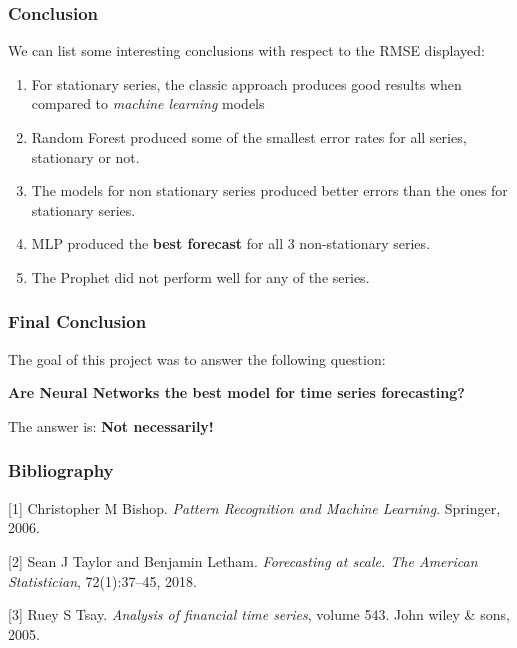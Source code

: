\documentclass{beamer}
\begin{document}
\begin{frame}
\begin{table}
{		}
	\end{table}
	
\end{frame}
	
	\begin{frame}
		\frametitle{Conclusion}
		We can list some interesting conclusions with respect to the RMSE displayed:\pause
		\begin{enumerate}
			\item For stationary series, the classic approach produces good results when compared to \textit{machine learning} models\pause
			\item Random Forest produced some of the smallest error rates for all series, stationary or not.\pause
			\item The models for non stationary series produced better errors than the ones for stationary series.\pause
			\item MLP produced the \textbf{best forecast} for all 3 non-stationary series.\pause
			\item The Prophet did not perform well for any of the series.
		\end{enumerate}
	\end{frame}

	\begin{frame}
		\frametitle{Final Conclusion}
		The goal of this project was to answer the following question:
		
		\textbf{Are Neural Networks the best model for time series forecasting?}
		
		The answer is: \pause \textbf{Not necessarily!}
		
		
	\end{frame}
	
	\begin{frame}
		\frametitle{Bibliography}
		
		
		[1] Christopher M Bishop. \textit{Pattern Recognition and Machine
		Learning}. Springer, 2006.
		
		[2] Sean J Taylor and Benjamin Letham. \textit{Forecasting at scale. The
		American Statistician}, 72(1):37–45, 2018.
		
		[3] Ruey S Tsay. \textit{Analysis of financial time series}, volume 543.
		John wiley \& sons, 2005.
	\end{frame}
	
\end{document}
